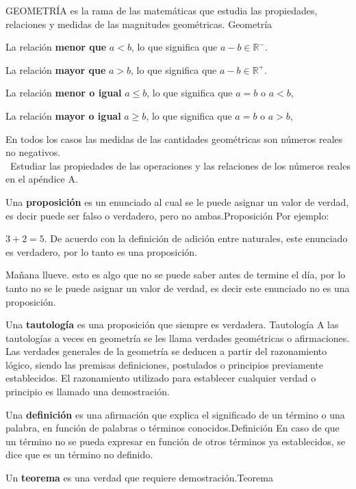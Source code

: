 \documentclass[12pt]{book}
\begin{document}
\begin{ideas}
\begin{ideas}{GEOMETRÍA es la rama de las matemáticas que estudia las propiedades, relaciones y
medidas de las magnitudes geométricas.
}{Geometría}
\begin{lista}
\item La relación \textbf{menor que} $a<b$,
 lo que significa que $a-b \in \mathbb{R^-}$.
\item La relación \textbf{mayor que} $a>b$,
lo que significa que $a-b \in \mathbb{R^+}$.
\item La relación \textbf{menor o igual} $a\leq b$, lo que significa que $a=b$ o $a<b$,
\item La relación \textbf{mayor o igual} $a\geq b$, lo que significa que $a=b$ o $a>b$,
\end{lista}
En todos los casos las medidas de las cantidades geométricas son números reales no negativos.\\
\nota \, Estudiar las propiedades de las operaciones y las relaciones de los
números reales en el apéndice A.
\end{ideas}
\begin{ideas}{Una \textbf{proposición} es un enunciado al cual se le puede asignar un valor de verdad,
es decir puede ser falso o verdadero, pero no ambas.}{Proposición}
Por ejemplo:
\begin{lista}
 \item $3+2=5$. De acuerdo con la definición de adición entre naturales,
este enunciado es verdadero, por lo tanto es una proposición.
\item Mañana llueve. esto es algo que no se puede saber antes de termine el día, por lo tanto
no se le puede asignar un valor de verdad, es decir este enunciado no es una proposición.
\end{lista}
\begin{ideas}{Una \textbf{tautología} es una proposición que siempre es
verdadera. }{Tautología}
 A las tautologías a veces en geometría se les llama verdades geométricas o afirmaciones.
Las verdades generales de la geometría se deducen a partir del razonamiento lógico,
siendo las premisas definiciones, postulados o principios previamente
establecidos. El razonamiento utilizado para establecer cualquier verdad o
principio es llamado una demostración.
\end{ideas}
\begin{ideas}{Una \textbf{definición} es una afirmación que explica el significado de un término o una palabra, en función
de palabras o términos conocidos.}{Definición}
En caso de que un término no se pueda expresar en función de otros términos ya establecidos, se dice que es un término no definido.
\end{ideas}
\begin{ideas}{Un \textbf{teorema} es una verdad que requiere demostración.}{Teorema}

\end{ideas}
\end{ideas}
\end{ideas}
\end{document}
